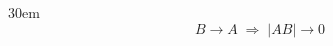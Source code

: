 \documentclass[border=4pt]{standalone}
\begin{document}
\begin{varwidth}{30em}
\large
\[ B \to A \;\Rightarrow\; \lvert AB \rvert \to 0 \]

\end{varwidth}
\end{document}
